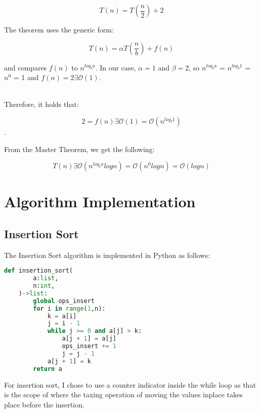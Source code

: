 \documentclass{article}
\begin{document}
$$T(n) = T(\frac{n}{2}) + 2$$

The theorem uses the generic form:

$$T(n) = \alpha T(\frac{n}{b}) + f(n)$$

and compares $f(n)$ to $n^{log_b a}$. In our case, $\alpha = 1$ and $\beta = 2$, so $n^{log_b a}$ = $n^{log_b 1}$ = $n^0$ = 1 and $f(n) = 2\exists \mathcal{O}(1)$.

\\

Therefore, it holds that:

$$2 = f(n)\exists \mathcal{O}(1) = \mathcal{O}(n^{log_b 1})$$.

From the Master Theorem, we get the following:

$$T(n) \exists \mathcal{O}(n^{log_b a} log n) = \mathcal{O}(n^0 log n) = \mathcal{O}(log n)$$

\section{Algorithm Implementation}
\subsection{Insertion Sort}
The Insertion Sort algorithm is implemented in Python as follows:
\begin{lstlisting}[language=Python]
    def insertion_sort(
        a:list,
        n:int,
    )->list:
        global ops_insert
        for i in range(1,n):
            k = a[i]
            j = i - 1
            while j >= 0 and a[j] > k:
                a[j + 1] = a[j]
                ops_insert += 1
                j = j - 1
            a[j + 1] = k
        return a
\end{lstlisting}

For insertion sort, I chose to use a counter indicator inside the while loop as that is the scope of where the taxing operation of moving the values inplace takes place before the insertion.
\end{document}
